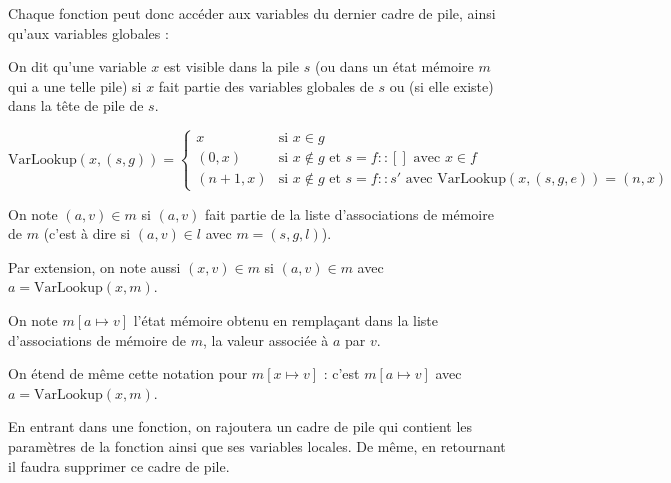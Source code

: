 Chaque fonction peut donc accéder aux variables du dernier cadre de pile, ainsi
qu'aux variables globales :

\begin{definition}[Visibilité]
  On dit qu'une variable $x$ est visible dans la pile $s$ (ou dans un état
  mémoire $m$ qui a une telle pile) si $x$ fait partie des variables globales de
  $s$ ou (si elle existe) dans la tête de pile de $s$.
\end{definition}

\begin{definition}

  \[
    \textrm{VarLookup} (x, (s, g)) =
      \begin{cases}
        x      & \mbox{si } x ∈ g \\
      (0, x)   & \mbox{si } x ∉ g \mbox{ et } s = f::[]
                 \mbox{ avec } x ∈ f \\
      (n+1, x) & \mbox{si } x ∉ g \mbox{ et } s = f::s'
                 \mbox{ avec } \textrm{VarLookup} (x, (s, g, e)) = (n, x)
      \end{cases}
  \]

\end{definition}

\begin{definition}

  On note $(a, v) ∈ m$ si $(a, v)$ fait partie de la liste d'associations de
  mémoire de $m$ (c'est à dire si $(a, v) ∈ l$ avec $m = (s, g, l)$).

  Par extension, on note aussi $(x, v) ∈ m$ si $(a, v) ∈ m$ avec $a =
  \textrm{VarLookup}(x, m)$.

  On note $m[a ↦ v]$ l'état mémoire obtenu en remplaçant dans la liste
  d'associations de mémoire de $m$, la valeur associée à $a$ par $v$.

  On étend de même cette notation pour $m[x ↦ v]$ : c'est $m[a ↦ v]$ avec
  $a = \textrm{VarLookup}(x, m)$.

\end{definition}

En entrant dans une fonction, on rajoutera un cadre de pile qui contient les
paramètres de la fonction ainsi que ses variables locales. De même, en
retournant il faudra supprimer ce cadre de pile.

